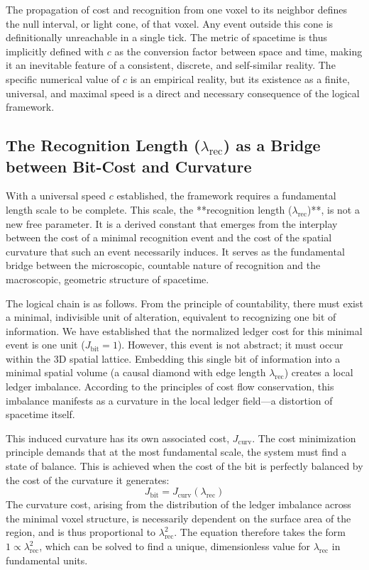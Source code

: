 \documentclass[11pt,a4paper]{article}
\begin{document}
The propagation of cost and recognition from one voxel to its neighbor defines the null interval, or light cone, of that voxel. Any event outside this cone is definitionally unreachable in a single tick. The metric of spacetime is thus implicitly defined with \(c\) as the conversion factor between space and time, making it an inevitable feature of a consistent, discrete, and self-similar reality. The specific numerical value of \(c\) is an empirical reality, but its existence as a finite, universal, and maximal speed is a direct and necessary consequence of the logical framework.

\subsection{The Recognition Length (\texorpdfstring{$\lambda_{\text{rec}}$}{lambda_rec}) as a Bridge between Bit-Cost and Curvature}
With a universal speed \(c\) established, the framework requires a fundamental length scale to be complete. This scale, the **recognition length (\(\lambda_{\text{rec}}\))**, is not a new free parameter. It is a derived constant that emerges from the interplay between the cost of a minimal recognition event and the cost of the spatial curvature that such an event necessarily induces. It serves as the fundamental bridge between the microscopic, countable nature of recognition and the macroscopic, geometric structure of spacetime.

The logical chain is as follows. From the principle of countability, there must exist a minimal, indivisible unit of alteration, equivalent to recognizing one bit of information. We have established that the normalized ledger cost for this minimal event is one unit (\(J_{\text{bit}} = 1\)). However, this event is not abstract; it must occur within the 3D spatial lattice. Embedding this single bit of information into a minimal spatial volume (a causal diamond with edge length \(\lambda_{\text{rec}}\)) creates a local ledger imbalance. According to the principles of cost flow conservation, this imbalance manifests as a curvature in the local ledger field—a distortion of spacetime itself.

This induced curvature has its own associated cost, \(J_{\text{curv}}\). The cost minimization principle demands that at the most fundamental scale, the system must find a state of balance. This is achieved when the cost of the bit is perfectly balanced by the cost of the curvature it generates:
\begin{equation}
J_{\text{bit}} = J_{\text{curv}}(\lambda_{\text{rec}})
\end{equation}
The curvature cost, arising from the distribution of the ledger imbalance across the minimal voxel structure, is necessarily dependent on the surface area of the region, and is thus proportional to \(\lambda_{\text{rec}}^2\). The equation therefore takes the form \(1 \propto \lambda_{\text{rec}}^2\), which can be solved to find a unique, dimensionless value for \(\lambda_{\text{rec}}\) in fundamental units.
\end{document}
